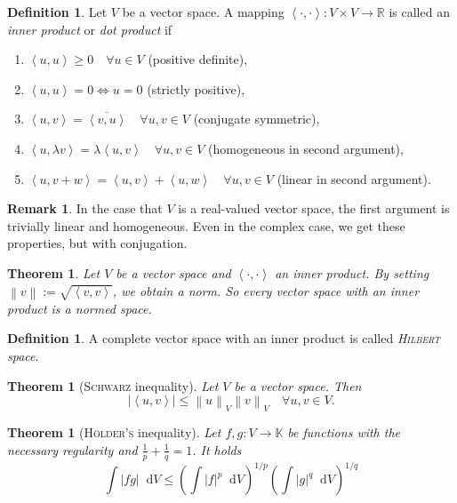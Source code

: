 \documentclass[12pt,a4paper,twoside, open=right]{scrreprt}
\theoremstyle{definition}
\newtheorem{rem}[auf]{Remark}
\newtheorem{defn}[auf]{Definition}
\theoremstyle{plain}
\newtheorem{sa}[auf]{Theorem}
\newcommand{\abs}[1]{\left\vert #1\right\vert}
\newcommand{\dotp}[2]{\left\langle #1,#2\right\rangle}
\newcommand{\rr}{\mathbb{R}}
\newcommand{\kk}{\mathbb{K}}
\newcommand{\norm}[1]{\left\lVert#1\right\rVert}
\newcommand{\D}{\mathop{}\!\mathrm{d}}
\begin{document}
\begin{defn}
    Let $V$ be a vector space. A mapping $\dotp{\cdot}{\cdot}\colon V\times V\to\rr$ is called an \emph{inner product} or \emph{dot product} if 
    \begin{enumerate}
        \item $\dotp{u}{u} \ge 0 \quad \forall u\in V$ (positive definite),
        \item $\dotp{u}{u} = 0 \Leftrightarrow u=0 $  (strictly positive),
        \item $\dotp{u}{v} = \overline{\dotp{v}{u}}   \quad\forall u,v\in V$ (conjugate symmetric),
        \item $\dotp{u}{\lambda v} = \lambda\dotp{u}{v} \quad\forall u,v\in V$ (homogeneous in second argument),
        \item $\dotp{u}{v+w} =\dotp{u}{v}+\dotp{u}{w} \quad\forall u,v\in V$ (linear in second argument).
    \end{enumerate}
\end{defn}
\begin{rem}
    In the case that $V$ is a real-valued vector space, the first argument is trivially linear and homogeneous. Even in the complex case, we get these properties, but with conjugation.
\end{rem}
\begin{sa}
    Let $V$ be a vector space and $\dotp{\cdot}{\cdot}$ an inner product. By setting $\norm{v}:=\sqrt{\dotp{v}{v}}$, we obtain a norm. So every vector space with an inner product is a normed space.
\end{sa}
\begin{defn}
    A complete vector space with an inner product is called \emph{\textsc{Hilbert} space}.
\end{defn}
\begin{sa}[\textsc{Schwarz} inequality]
    \label{sa:Schwarz}
    Let $V$ be a vector space. Then 
    \begin{equation}
        \abs{\dotp{u}{v}}\le\norm{u}_V\norm{v}_V\quad \forall u,v\in V.
    \end{equation}
\end{sa}
\begin{sa}[\textsc{Hölder's} inequality]
    \label{sa:hoelder}
    Let $f,g \colon V\to\kk$ be functions with the necessary regularity and $\frac{1}{p}+\frac{1}{q}=1$. It holds
    \begin{equation}
        \int\abs{fg}\D V\le\left(\int\abs{f}^p\D V\right)^{1/p}\left(\int\abs{g}^q\D V\right)^{1/q}
    \end{equation}
\end{sa}
\end{document}
